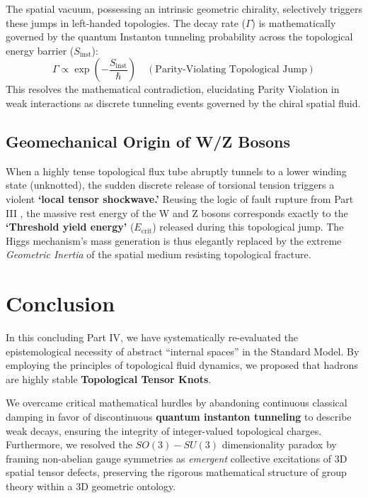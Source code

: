 \documentclass[reprint,amsmath,amssymb,aps,prd]{revtex4-2}
\begin{document}
The spatial vacuum, possessing an intrinsic geometric chirality, selectively triggers these jumps in left-handed topologies. The decay rate ($\Gamma$) is mathematically governed by the quantum Instanton tunneling probability across the topological energy barrier ($S_{\mathrm{inst}}$):
\begin{equation}
\Gamma \propto \exp\left( -\frac{S_{\mathrm{inst}}}{\hbar} \right) \quad (\text{Parity-Violating Topological Jump})
\end{equation}
This resolves the mathematical contradiction, elucidating Parity Violation in weak interactions \cite{Wu1957} as discrete tunneling events governed by the chiral spatial fluid.

\subsection{Geomechanical Origin of W/Z Bosons}
When a highly tense topological flux tube abruptly tunnels to a lower winding state (unknotted), the sudden discrete release of torsional tension triggers a violent \textbf{`local tensor shockwave.'} Reusing the logic of fault rupture from Part III \cite{YooPart3}, the massive rest energy of the W and Z bosons corresponds exactly to the \textbf{`Threshold yield energy'} ($E_{\mathrm{crit}}$) released during this topological jump. The Higgs mechanism's mass generation \cite{Higgs1964} is thus elegantly replaced by the extreme \textit{Geometric Inertia} of the spatial medium resisting topological fracture.

\section{Conclusion}

In this concluding Part IV, we have systematically re-evaluated the epistemological necessity of abstract ``internal spaces'' in the Standard Model. By employing the principles of topological fluid dynamics, we proposed that hadrons are highly stable \textbf{Topological Tensor Knots}.

We overcame critical mathematical hurdles by abandoning continuous classical damping in favor of discontinuous \textbf{quantum instanton tunneling} to describe weak decays, ensuring the integrity of integer-valued topological charges. Furthermore, we resolved the $SO(3)-SU(3)$ dimensionality paradox by framing non-abelian gauge symmetries as \textit{emergent} collective excitations of 3D spatial tensor defects, preserving the rigorous mathematical structure of group theory within a 3D geometric ontology. 
\end{document}
